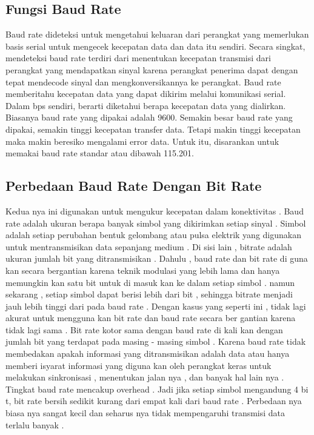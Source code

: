 \subsection{Fungsi Baud Rate}
Baud rate dideteksi untuk mengetahui keluaran dari perangkat yang memerlukan basis serial untuk mengecek kecepatan data dan data itu sendiri. \cite{anderson1973method} Secara singkat, mendeteksi baud rate terdiri dari menentukan kecepatan transmisi dari perangkat yang mendapatkan sinyal karena perangkat penerima dapat dengan tepat mendecode sinyal dan mengkonversikannya ke perangkat. Baud rate memberitahu kecepatan data yang dapat dikirim melalui komunikasi serial. Dalam bps sendiri, berarti diketahui berapa kecepatan data yang dialirkan. Biasanya baud rate yang dipakai adalah 9600. Semakin besar baud rate yang dipakai, semakin tinggi kecepatan transfer data. Tetapi makin tinggi kecepatan maka makin beresiko mengalami error data. Untuk itu, disarankan untuk memakai baud rate standar atau dibawah 115.201.

\subsection{Perbedaan Baud Rate Dengan Bit Rate }
Kedua nya ini digunakan untuk mengukur kecepatan dalam konektivitas . Baud rate adalah ukuran berapa banyak simbol yang dikirimkan setiap sinyal . Simbol adalah setiap perubahan bentuk gelombang atau pulsa elektrik yang digunakan untuk mentransmisikan data sepanjang medium . Di sisi lain , bitrate adalah ukuran jumlah bit yang ditransmisikan . Dahulu , baud rate dan bit rate di guna kan secara bergantian karena teknik modulasi yang lebih lama dan  hanya memungkin kan satu bit untuk di masuk kan ke dalam setiap simbol . namun sekarang , setiap simbol dapat berisi lebih dari bit , sehingga bitrate menjadi jauh lebih tinggi dari pada baud rate . Dengan kasus yang seperti ini , tidak lagi akurat untuk mengguna kan bit rate dan baud rate secara ber gantian karena tidak lagi sama . Bit rate kotor sama dengan baud rate di kali kan dengan jumlah bit yang terdapat pada masing - masing simbol .
Karena baud rate tidak membedakan apakah informasi yang ditransmisikan adalah data atau hanya memberi isyarat informasi yang diguna kan oleh perangkat keras untuk melakukan sinkronisasi , menentukan jalan nya , dan banyak hal lain nya . Tingkat baud rate mencakup overhead . Jadi jika setiap simbol mengandung 4 bi t, bit rate bersih sedikit kurang dari empat kali dari baud rate . Perbedaan nya biasa nya sangat kecil dan seharus nya tidak mempengaruhi transmisi data terlalu banyak .

